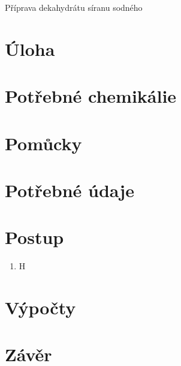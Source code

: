 \documentclass[13pt, a4paper, twoside]{article}
\begin{document}
\begin{center}
    \Huge
    Příprava dekahydrátu síranu sodného
\end{center}
\large \onehalfspacing
\section*{Úloha}

\section*{Potřebné chemikálie}

\section*{Pomůcky}

\section*{Potřebné údaje}

\section*{Postup}
\begin{enumerate}
   \item H
\end{enumerate}
\section*{Výpočty}

\section*{Závěr}
\end{document}
